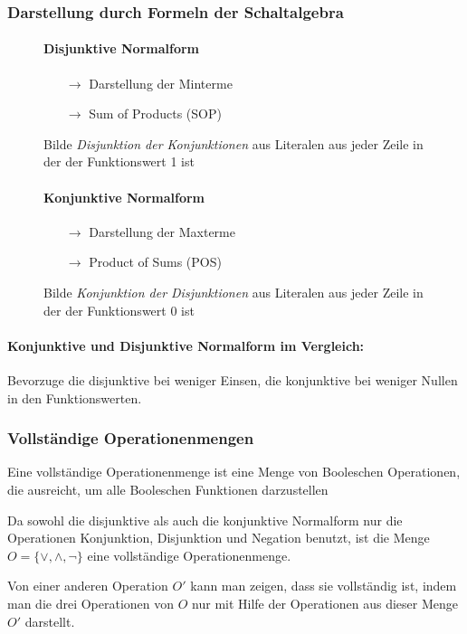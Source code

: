 \documentclass[12pt]{report}
\begin{document}
\subsubsection{Darstellung durch Formeln der Schaltalgebra}
\begin{figure}[H]
  \begin{minipage}{0.46\textwidth}
    \paragraph{Disjunktive Normalform}
    \begin{itemize}
      \item[$\rightarrow$] Darstellung der Minterme
      \item[$\rightarrow$] Sum of Products (SOP)
    \end{itemize}
    Bilde \textit{Disjunktion der Konjunktionen} aus Literalen aus jeder Zeile in der der Funktionswert 1 ist
  \end{minipage}
  \hfill
  \begin{minipage}{0.46\textwidth}
    \paragraph{Konjunktive Normalform}
    \begin{itemize}
      \item[$\rightarrow$] Darstellung der Maxterme
      \item[$\rightarrow$] Product of Sums (POS)
    \end{itemize}
    Bilde \textit{Konjunktion der Disjunktionen} aus Literalen aus jeder Zeile in der der Funktionswert 0 ist
  \end{minipage}
\end{figure}

\paragraph{Konjunktive und Disjunktive Normalform im Vergleich:}
Bevorzuge die disjunktive bei weniger Einsen, die konjunktive
bei weniger Nullen in den Funktionswerten.

\subsubsection{Vollständige Operationenmengen}
\begin{defbox}
  Eine vollständige Operationenmenge ist eine Menge von Booleschen Operationen, die ausreicht, um alle Booleschen Funktionen darzustellen
\end{defbox}
Da sowohl die disjunktive als auch die konjunktive Normalform nur die Operationen Konjunktion, Disjunktion und Negation benutzt, ist die Menge $O=\{ \vee, \wedge, \neg\}$ eine vollständige Operationenmenge.
\par Von einer anderen Operation $O'$ kann man zeigen, dass sie vollständig ist, indem man die drei Operationen von $O$ nur mit Hilfe der Operationen aus dieser Menge $O'$ darstellt.
\end{document}
